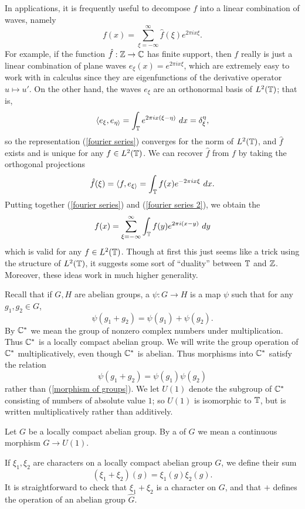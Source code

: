 In applications, it is frequently useful to decompose $f$ into a linear combination of waves, namely
\begin{equation}\label{fourier series}
f(x) = \sum_{\xi=-\infty}^{\infty} \hat f(\xi) e^{2\pi ix\xi}.
\end{equation}
For example, if the function $\hat f: \mathbb{Z} \to \mathbb{C}$ has finite support, then $f$ really is just a linear combination of plane waves $e_\xi(x) = e^{2\pi i x\xi}$, which are extremely easy to work with in calculus since they are eigenfunctions of the derivative operator $u \mapsto u'$.
On the other hand, the waves $e_\xi$ are an orthonormal basis of $L^2(\mathbb{T})$; that is,
\[\langle e_\xi, e_{\eta\rangle} = \int_{\mathbb{T}} e^{2\pi i x(\xi - \eta)} ~dx = \delta_\xi^\eta,\]
so the representation (\ref{fourier series}) converges for the norm of $L^2(\mathbb{T})$, and $\hat f$ exists and is unique for any $f \in L^2(\mathbb{T})$.
We can recover $\hat f$ from $f$ by taking the orthogonal projections
\begin{equation}\label{fourier series 2}
\hat f(\xi) = \langle f, e_{\xi\rangle} = \int_{\mathbb{T}} f(x) e^{-2\pi ix\xi} ~dx.
\end{equation}
Putting together (\ref{fourier series}) and (\ref{fourier series 2}), we obtain the 
\begin{equation}\label{fourier series 3}
f(x) = \sum_{\xi = -\infty}^{\infty} \int_{\mathbb{T}} f(y) e^{2\pi i(x-y)}~dy
\end{equation}
which is valid for any $f \in L^2(\mathbb{T})$. Though at first this just seems like a trick using the structure of $L^2(\mathbb{T})$, it suggests some sort of ``duality'' between $\mathbb{T}$ and $\mathbb{Z}$.
Moreover, these ideas work in much higher generality.

Recall that if $G,H$ are abelian groups, a  $\psi: G \to H$ is a map $\psi$ such that for any $g_1, g_2 \in G$,
\begin{equation}\label{morphism of groups}
\psi(g_1 + g_2) = \psi(g_1) + \psi(g_2).
\end{equation}
By $\mathbb{C}^*$ we mean the group of nonzero complex numbers under multiplication. Thus $\mathbb{C}^*$ is a locally compact abelian group.
We will write the group operation of $\mathbb{C}^*$ multiplicatively, even though $\mathbb{C}^*$ is abelian. Thus morphisms into $\mathbb{C}^*$ satisfy the relation
\[\psi(g_1 + g_2) = \psi(g_1)\psi(g_2)\]
rather than (\ref{morphism of groups}).
We let $U(1)$ denote the subgroup of $\mathbb{C}^*$ consisting of numbers of absolute value $1$; so $U(1)$ is isomorphic to $\mathbb{T}$, but is written multiplicatively rather than additively.
\begin{definition}
Let $G$ be a locally compact abelian group.
By a  of $G$ we mean a continuous morphism $G \to U(1)$.
\end{definition}
If $\xi_1, \xi_2$ are characters on a locally compact abelian group $G$, we define their sum
\[(\xi_1 + \xi_2)(g) = \xi_1(g)\xi_2(g).\]
It is straightforward to check that $\xi_1 + \xi_2$ is a character on $G$, and that $+$ defines the operation of an abelian group $\hat G$.

